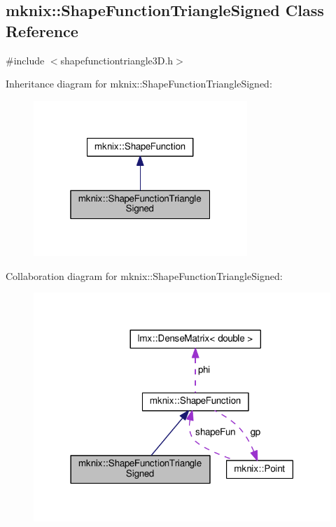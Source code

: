\hypertarget{classmknix_1_1_shape_function_triangle_signed}{}\subsection{mknix\+:\+:Shape\+Function\+Triangle\+Signed Class Reference}
\label{classmknix_1_1_shape_function_triangle_signed}


{\ttfamily \#include $<$shapefunctiontriangle3\+D.\+h$>$}



Inheritance diagram for mknix\+:\+:Shape\+Function\+Triangle\+Signed\+:\nopagebreak
\begin{figure}[H]
\begin{center}
\leavevmode
\includegraphics[width=229pt]{da/da5/classmknix_1_1_shape_function_triangle_signed__inherit__graph}
\end{center}
\end{figure}


Collaboration diagram for mknix\+:\+:Shape\+Function\+Triangle\+Signed\+:\nopagebreak
\begin{figure}[H]
\begin{center}
\leavevmode
\includegraphics[width=318pt]{dc/d0d/classmknix_1_1_shape_function_triangle_signed__coll__graph}
\end{center}
\end{figure}
